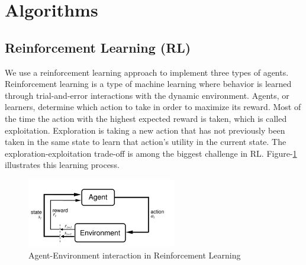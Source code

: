 \section{Algorithms}
\graphicspath{ {Images/} }

\subsection{Reinforcement Learning (RL)}\label{RL}
We use a reinforcement learning approach to implement three types of agents. Reinforcement learning is a type of machine learning where behavior is learned through trial-and-error interactions with the dynamic environment. Agents, or learners, determine which action to take in order to maximize  its reward. Most of the time the action with the highest expected reward is taken, which is called exploitation. Exploration is taking a new action that has not previously been taken in the same state to learn that action's utility in the current state. The exploration-exploitation trade-off is among the biggest challenge in RL. Figure-\ref{fig:res} illustrates this learning process.


 
 
 
 \begin{figure}[htb]

\begin{minipage}[b]{1.0\linewidth}
  \centering
  \centerline{\includegraphics[width=6.5cm]{RL}}
  
\end{minipage}
\caption{ Agent-Environment interaction in Reinforcement Learning~\cite{Sutton98reinforcementlearning}}
\label{fig:res}
%
\end{figure}

